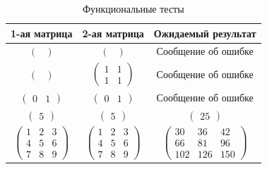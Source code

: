 \documentclass[a4paper,14pt, unknownkeysallowed]{extreport}
\begin{document}
\begin{table}[h]
	\begin{center}
	\begin{threeparttable}
		\captionsetup{justification=raggedright,singlelinecheck=off}
		\caption{\label{tbl:functional_test} Функциональные тесты}
		\begin{tabular}{|c|c|c|}
			\hline
			1-ая матрица & 2-ая матрица & Ожидаемый результат 
			\\ \hline
			$\begin{pmatrix}
				\\
			 \end{pmatrix}$ &
			 $\begin{pmatrix}
				\\
			 \end{pmatrix}$ &
			Сообщение об ошибке

			\\ \hline
			$\begin{pmatrix}
				\\
			 \end{pmatrix}$ &
			$\begin{pmatrix}
				1 & 1\\
				1 & 1
			 \end{pmatrix}$ &
			Сообщение об ошибке

			\\ \hline
			$\begin{pmatrix}
				0 & 1
			 \end{pmatrix}$ &
			$\begin{pmatrix}
				0 & 1
			\end{pmatrix}$ &
			Сообщение об ошибке 
			
			\\ \hline
			$\begin{pmatrix}
				5
			 \end{pmatrix}$ &
			$\begin{pmatrix}
				5
			\end{pmatrix}$ &
			$\begin{pmatrix}
				25
			\end{pmatrix}$

			\\ \hline
			$\begin{pmatrix}
				1 & 2 & 3\\
				4 & 5 & 6\\
				7 & 8 & 9
			\end{pmatrix}$ &
			$\begin{pmatrix}
				1 & 2 & 3\\
				4 & 5 & 6\\
				7 & 8 & 9
			\end{pmatrix}$ &
			$\begin{pmatrix}
				30 & 36 & 42\\
				66 & 81 & 96\\
				102 & 126 & 150
			\end{pmatrix}$ 
			                 

\end{tabular}
\end{threeparttable}
\end{center}
\end{table}
\end{document}
